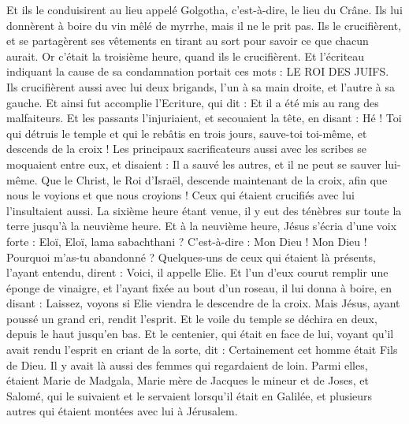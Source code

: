 \begin{multicols}{2}
Et ils le conduisirent au lieu appelé Golgotha, c'est-à-dire, le lieu du Crâne.
Ils lui donnèrent à boire du vin mêlé de myrrhe, mais il ne le prit pas.
Ils le crucifièrent, et se partagèrent ses vêtements en tirant au sort pour savoir ce que chacun aurait.
Or c'était la troisième heure, quand ils le crucifièrent.
Et l'écriteau indiquant la cause de sa condamnation portait ces mots : LE ROI DES JUIFS.
Ils crucifièrent aussi avec lui deux brigands, l'un à sa main droite, et l'autre à sa gauche.
Et ainsi fut accomplie l'Ecriture, qui dit : Et il a été mis au rang des malfaiteurs.
Et les passants l'injuriaient, et secouaient la tête, en disant : Hé ! Toi qui détruis le temple et qui le rebâtis en trois jours,
sauve-toi toi-même, et descends de la croix !
Les principaux sacrificateurs aussi avec les scribes se moquaient entre eux, et disaient : Il a sauvé les autres, et il ne peut se sauver lui-même.
Que le Christ, le Roi d'Israël, descende maintenant de la croix, afin que nous le voyions et que nous croyions ! Ceux qui étaient crucifiés avec lui l'insultaient aussi.
La sixième heure étant venue, il y eut des ténèbres sur toute la terre jusqu'à la neuvième heure.
Et à la neuvième heure, Jésus s'écria d'une voix forte : Eloï, Eloï, lama sabachthani ? C'est-à-dire : Mon Dieu ! Mon Dieu ! Pourquoi m'as-tu abandonné ?
Quelques-uns de ceux qui étaient là présents, l'ayant entendu, dirent : Voici, il appelle Elie.
Et l'un d'eux courut remplir une éponge de vinaigre, et l'ayant fixée au bout d'un roseau, il lui donna à boire, en disant : Laissez, voyons si Elie viendra le descendre de la croix.
Mais Jésus, ayant poussé un grand cri, rendit l'esprit.
Et le voile du temple se déchira en deux, depuis le haut jusqu'en bas.
Et le centenier, qui était en face de lui, voyant qu'il avait rendu l'esprit en criant de la sorte, dit : Certainement cet homme était Fils de Dieu.
Il y avait là aussi des femmes qui regardaient de loin. Parmi elles, étaient Marie de Madgala, Marie mère de Jacques le mineur et de Joses, et Salomé,
qui le suivaient et le servaient lorsqu'il était en Galilée, et plusieurs autres qui étaient montées avec lui à Jérusalem.

\end{multicols}
